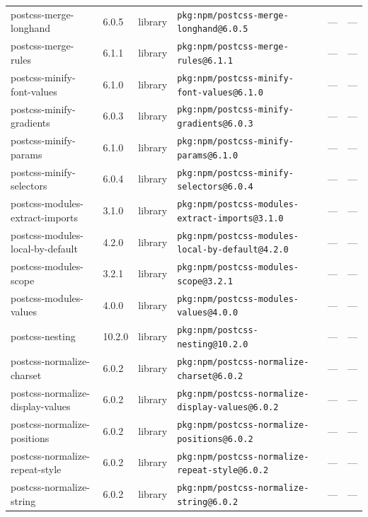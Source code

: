 \documentclass[11pt,a4paper]{article}
\begin{document}
\begin{longtable}{|p{4cm}|p{2cm}|p{1.6cm}|p{5cm}|p{1.5cm}|p{3.5cm}|}
\raggedright postcss-merge-longhand & 6.0.5 & library & \small\texttt{pkg:npm/postcss-merge-longhand@6.0.5} & — & \small — \\
\raggedright postcss-merge-rules & 6.1.1 & library & \small\texttt{pkg:npm/postcss-merge-rules@6.1.1} & — & \small — \\
\raggedright postcss-minify-font-values & 6.1.0 & library & \small\texttt{pkg:npm/postcss-minify-font-values@6.1.0} & — & \small — \\
\raggedright postcss-minify-gradients & 6.0.3 & library & \small\texttt{pkg:npm/postcss-minify-gradients@6.0.3} & — & \small — \\
\raggedright postcss-minify-params & 6.1.0 & library & \small\texttt{pkg:npm/postcss-minify-params@6.1.0} & — & \small — \\
\raggedright postcss-minify-selectors & 6.0.4 & library & \small\texttt{pkg:npm/postcss-minify-selectors@6.0.4} & — & \small — \\
\raggedright postcss-modules-extract-imports & 3.1.0 & library & \small\texttt{pkg:npm/postcss-modules-extract-imports@3.1.0} & — & \small — \\
\raggedright postcss-modules-local-by-default & 4.2.0 & library & \small\texttt{pkg:npm/postcss-modules-local-by-default@4.2.0} & — & \small — \\
\raggedright postcss-modules-scope & 3.2.1 & library & \small\texttt{pkg:npm/postcss-modules-scope@3.2.1} & — & \small — \\
\raggedright postcss-modules-values & 4.0.0 & library & \small\texttt{pkg:npm/postcss-modules-values@4.0.0} & — & \small — \\
\raggedright postcss-nesting & 10.2.0 & library & \small\texttt{pkg:npm/postcss-nesting@10.2.0} & — & \small — \\
\raggedright postcss-normalize-charset & 6.0.2 & library & \small\texttt{pkg:npm/postcss-normalize-charset@6.0.2} & — & \small — \\
\raggedright postcss-normalize-display-values & 6.0.2 & library & \small\texttt{pkg:npm/postcss-normalize-display-values@6.0.2} & — & \small — \\
\raggedright postcss-normalize-positions & 6.0.2 & library & \small\texttt{pkg:npm/postcss-normalize-positions@6.0.2} & — & \small — \\
\raggedright postcss-normalize-repeat-style & 6.0.2 & library & \small\texttt{pkg:npm/postcss-normalize-repeat-style@6.0.2} & — & \small — \\
\raggedright postcss-normalize-string & 6.0.2 & library & \small\texttt{pkg:npm/postcss-normalize-string@6.0.2} & — & \small — \\

\end{longtable}
\end{document}
